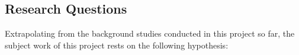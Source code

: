 \subsection{Research Questions}















Extrapolating from the background studies conducted in this project so
far, the subject work of this project rests on the following
hypothesis:

